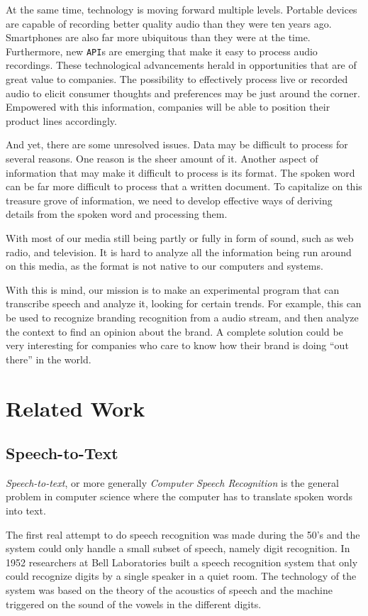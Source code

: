 \documentclass[a4paper,12pt,twoside]{ltxdoc}
\begin{document}
At the same time, technology is moving forward multiple levels. Portable devices are capable of recording better quality
audio than they were ten years ago. Smartphones are also far more ubiquitous than they were at the time.
Furthermore, new \verb#API#s are emerging that make it easy to process audio recordings. These technological advancements herald
in opportunities that are of great value to companies. The possibility to effectively process live or recorded audio
to elicit consumer thoughts and preferences may be just around the corner. Empowered with this information, companies will
be able to position their product lines accordingly.

And yet, there are some unresolved issues. Data may be difficult to process for several reasons. One reason is the sheer
amount of it. Another aspect of information that may make it difficult to process is its format. The spoken word can be 
far more difficult to process that a written document. To capitalize on this treasure grove of information, we need
to develop effective ways of deriving details from the spoken word and processing them.

With most of our media still being partly or fully in form of sound, such  as web radio, and television.
It is hard to analyze all the information being run around on this media, as the format is not
native to our computers and systems. 

With this is mind, our mission is to make an experimental program that can transcribe speech and analyze it, looking for certain trends.
For example, this can be used to recognize branding recognition from a audio stream, and then analyze the context to find an opinion about the brand.
A complete solution could be very interesting for companies who care to know how their brand is doing ``out there'' in the world.

\section{Related Work}
\subsection{Speech-to-Text}
\emph{Speech-to-text}, or more generally \emph{Computer Speech Recognition} is the general problem in computer science where the computer has to translate spoken words into text.

The first real attempt to do speech recognition was made during the 50's and the system could only handle a small subset of speech, namely digit recognition. In 1952 researchers at Bell Laboratories built a speech recognition system that only could recognize digits by a single speaker in a quiet room. The technology of  the system was based on the theory of the acoustics of speech and the machine triggered on the sound of the vowels in the different digits.
\end{document}
